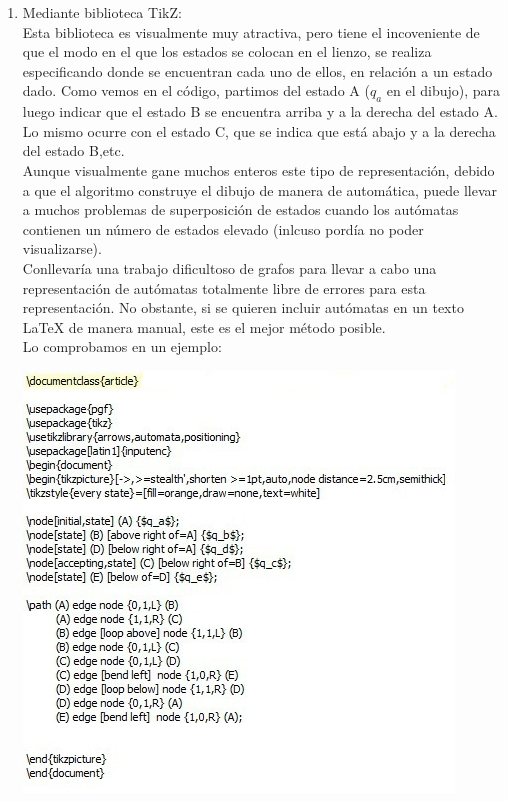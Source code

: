 \documentclass[12pt,a4paper,spanish]{book}
\begin{document}
\begin{itemize}
\begin{enumerate}
\item Mediante biblioteca TikZ:\\
\newline
Esta biblioteca es visualmente muy atractiva, pero tiene el incoveniente de que el modo en el que los estados se colocan en el lienzo, se realiza especificando donde se encuentran cada uno de ellos, en relaci\'on a un estado dado.
Como vemos en el c\'odigo, partimos del estado A ($q_{a}$ en el dibujo), para luego indicar que el estado B se encuentra arriba y a la derecha del estado A. Lo mismo ocurre con el estado C, que se indica que est\'a abajo y a la derecha del estado B,etc.\\
\newline
Aunque visualmente gane muchos enteros este tipo de representaci\'on, debido a que el algoritmo construye el dibujo de manera de autom\'atica, puede llevar a muchos problemas de superposici\'on de estados cuando los aut\'omatas contienen un n\'umero de estados elevado (inlcuso pord\'ia no poder visualizarse).\\ 
Conllevar\'ia una trabajo dificultoso de grafos para llevar a cabo una representaci\'on de aut\'omatas totalmente libre de errores para esta representaci\'on.
No obstante, si se quieren incluir aut\'omatas en un texto \LaTeX{} de manera manual, este es el mejor m\'etodo posible.\\

Lo comprobamos en un ejemplo:\newline \newline
\begin{center}
\includegraphics{late2aux.jpg}
\end{center}


\end{enumerate}
\end{itemize}
\end{document}
